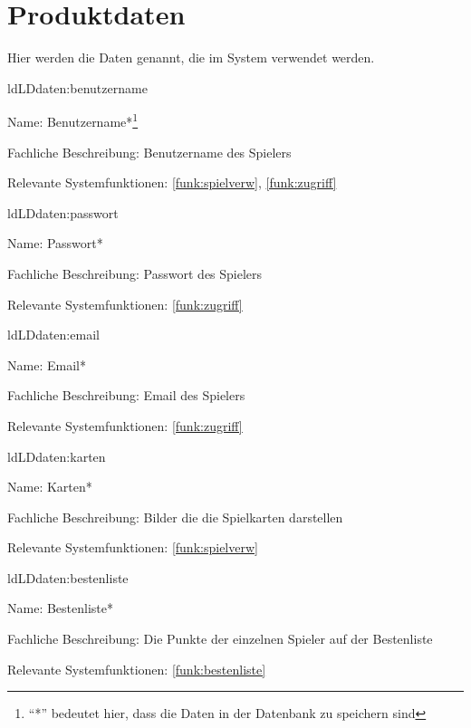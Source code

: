 
\section{Produktdaten}\label{section:productdaten}

Hier werden die Daten genannt, die im System verwendet werden.

\setcounter{ld}{10}

\begin{description}[leftmargin=5em, style=sameline]
	
	\begin{lhp}{ld}{LD}{daten:benutzername}
		\item [Name:] Benutzername*\footnote{``*'' bedeutet hier, dass die Daten in der Datenbank zu speichern sind}
		\item [Fachliche Beschreibung:] Benutzername des Spielers
		\item [Relevante Systemfunktionen:] \ref{funk:spielverw}, \ref{funk:zugriff}
	\end{lhp}
	
	\begin{lhp}{ld}{LD}{daten:passwort}
		\item [Name:] Passwort*
		\item [Fachliche Beschreibung:] Passwort des Spielers
		\item [Relevante Systemfunktionen:] \ref{funk:zugriff}
	\end{lhp}
	
	\begin{lhp}{ld}{LD}{daten:email}
		\item [Name:] Email*
		\item [Fachliche Beschreibung:] Email des Spielers
		\item [Relevante Systemfunktionen:] \ref{funk:zugriff}
	\end{lhp}

	\begin{lhp}{ld}{LD}{daten:karten}
		\item [Name:] Karten*
		\item [Fachliche Beschreibung:] Bilder die die Spielkarten darstellen
		\item [Relevante Systemfunktionen:] \ref{funk:spielverw}
	\end{lhp}
	
	\begin{lhp}{ld}{LD}{daten:bestenliste}
		\item [Name:] Bestenliste*
		\item [Fachliche Beschreibung:] Die Punkte der einzelnen Spieler auf der Bestenliste
		\item [Relevante Systemfunktionen:] \ref{funk:bestenliste}
	\end{lhp}
	
\end{description}